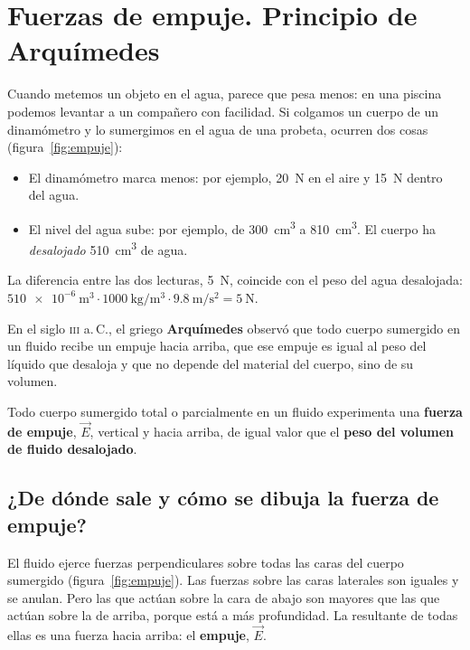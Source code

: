 \section[Fuerzas de empuje. Principio de Arquímedes]{Fuerzas de empuje. Principio de Arquímedes}

Cuando metemos un objeto en el agua, parece que pesa menos: en una piscina podemos levantar a un compañero con facilidad. Si colgamos un cuerpo de un dinamómetro y lo sumergimos en el agua de una probeta, ocurren dos cosas (figura~\ref{fig:empuje}):
\begin{itemize}
    \item El dinamómetro marca menos: por ejemplo, \qty{20}{\newton} en el aire y \qty{15}{\newton} dentro del agua.
    \item El nivel del agua sube: por ejemplo, de \qty{300}{\cubic\cm} a \qty{810}{\cubic\cm}. El cuerpo ha \emph{desalojado} \qty{510}{\cubic\cm} de agua.
\end{itemize}
La diferencia entre las dos lecturas, \qty{5}{\newton}, coincide con el peso del agua desalojada: \(\num{510e-6}~\unit{\cubic\m} \cdot \qty{1000}{\kg\per\cubic\m} \cdot \qty{9.8}{\m\per\square\s} = \qty{5}{\newton}\).

En el siglo \textsc{iii} a.\,C., el griego \textbf{Arquímedes} observó que todo cuerpo sumergido en un fluido recibe un empuje hacia arriba, que ese empuje es igual al peso del líquido que desaloja y que no depende del material del cuerpo, sino de su volumen.

\begin{definition}
    Todo cuerpo sumergido total o parcialmente en un fluido experimenta una \textbf{fuerza de empuje}, \(\vec{E}\), vertical y hacia arriba, de igual valor que el \textbf{peso del volumen de fluido desalojado}.
\end{definition}

\subsection{¿De dónde sale y cómo se dibuja la fuerza de empuje?}

El fluido ejerce fuerzas perpendiculares sobre todas las caras del cuerpo sumergido (figura~\ref{fig:empuje}). Las fuerzas sobre las caras laterales son iguales y se anulan. Pero las que actúan sobre la cara de abajo son mayores que las que actúan sobre la de arriba, porque está a más profundidad. La resultante de todas ellas es una fuerza hacia arriba: el \textbf{empuje}, \(\vec{E}\).

